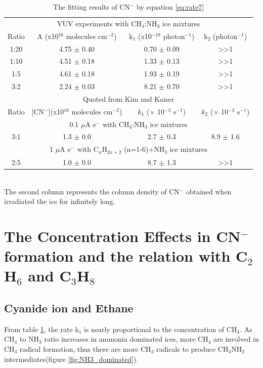 \begin{table}[htbp]
\caption{The fitting results of CN$^-$ by equation \ref{eq:rate7}}
\label{tab:CNrate}
\begin{tabular}{cccc}
\hline
\hline
\multicolumn{4}{c}{VUV experiments with CH$_4$:NH$_3$ ice mixtures}\\
Ratio & A (x10$^{16}$ molecules cm$^{-2}$) & k$_1$ (x10$^{-18}$ photon$^{-1}$) & k$_2$ (photon$^{-1}$)\\
\hline
1:20 & 4.75 $\pm$ 0.40 & 0.70 $\pm$ 0.09 & >>1 \\
1:10 & 4.51 $\pm$ 0.18 & 1.33 $\pm$ 0.13 & >>1 \\
1:5 & 4.61 $\pm$ 0.18 & 1.93 $\pm$ 0.19 & >>1 \\
3:2 & 2.24 $\pm$ 0.03 & 8.21 $\pm$ 0.70 & >>1 \\
\hline
\hline
\multicolumn{4}{c}{Quoted from Kim and Kaiser\cite{kim}} \\
Ratio & [CN$^-$](x10$^{16}$ molecules cm$^{-2}$) & $k_1$ ($\times$ 10$^{-3}$ s$^{-1}$) &  $k_2$  ($\times$ 10$^{-3}$ s$^{-1}$)\\
\hline
\multicolumn{4}{c}{0.1 $\mu$A e$^-$ with CH$_4$:NH$_3$ ice mixtures}\\
3:1 & 1.3 $\pm$ 0.0 & 2.7 $\pm$ 0.3 & 8.9 $\pm$ 1.6 \\
\hline
\multicolumn{4}{c}{1 $\mu$A e$^-$ with C$_n$H$_{2n+2}$ (n=1-6)+NH$_3$ ice mixtures}\\
2:5 & 1.0 $\pm$ 0.0 & 8.7 $\pm$ 1.3 & >>1 \\
\hline
\end{tabular}\\
The second column represents the column density of CN$^-$ obtained when irradiated the ice for infinitely long.\
\end{table}

\section{The Concentration Effects in CN$^-$formation and the relation with C$_2$H$_6$ and C$_3$H$_8$}



\subsection{Cyanide ion and Ethane}

From table \ref{tab:CNrate}, the rate k$_1$ is nearly proportional to the concentration of CH$_4$.  As CH$_4$ to NH$_3$ ratio increases in ammonia dominated ices, more CH$_4$ are involved in CH$_3$ radical formation, thus there are more CH$_3$ radicals to produce CH$_3$NH$_2$ intermediates(figure \ref{fig:NH3_dominated}).\\

